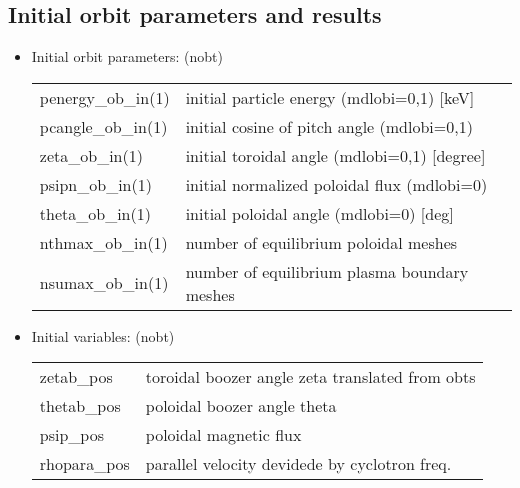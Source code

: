 \documentclass[11pt]{article}
\begin{document}
\subsection{Initial orbit parameters and results}

\begin{itemize}
\item
  Initial orbit parameters: (nobt)
  \begin{center}
    \begin{tabular}{ll}
    penergy\_ob\_in(1) & initial particle energy (mdlobi=0,1)
    [keV] \\
    pcangle\_ob\_in(1) & initial cosine of pitch angle
    (mdlobi=0,1) \\
    zeta\_ob\_in(1)    & initial toroidal angle (mdlobi=0,1)
    [degree] \\
    psipn\_ob\_in(1)   & initial normalized poloidal flux
    (mdlobi=0) \\
    theta\_ob\_in(1)   & initial poloidal angle (mdlobi=0)
    [deg] \\
    nthmax\_ob\_in(1)   & number of equilibrium poloidal meshes \\
    nsumax\_ob\_in(1)   & number of equilibrium plasma boundary meshes
    \end{tabular}
  \end{center}

\item
  Initial variables:  (nobt)
  \begin{center}
    \begin{tabular}{ll}
       zetab\_pos     & toroidal boozer angle zeta translated from obts \\
       thetab\_pos    & poloidal boozer angle theta \\
       psip\_pos      & poloidal magnetic flux \\
       rhopara\_pos   & parallel velocity devidede by cyclotron freq.
    \end{tabular}
  \end{center}


\end{itemize}
\end{document}
